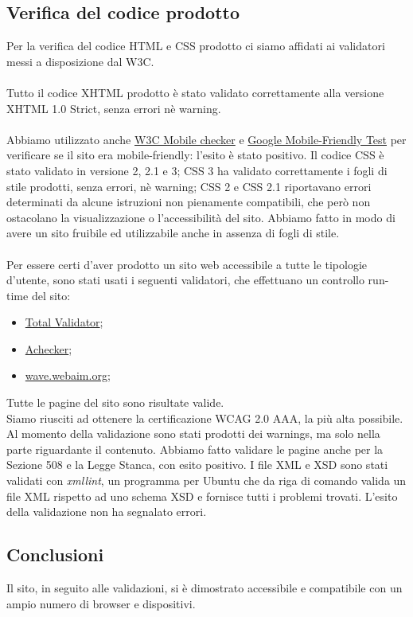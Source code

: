 {	\subsection{Verifica del codice prodotto}{
		Per la verifica del codice HTML e CSS prodotto ci siamo affidati ai validatori messi a disposizione dal W3C.\\
		\\
		Tutto il codice XHTML prodotto è stato validato correttamente alla versione XHTML 1.0 Strict, senza errori nè warning.\\
		\\
		Abbiamo utilizzato anche \href{https://validator.w3.org/mobile-alpha/}{W3C Mobile checker} e \href{https://www.google.com/webmasters/tools/mobile-friendly/}{Google Mobile-Friendly Test} per verificare se il sito era mobile-friendly: l'esito è stato positivo.
		Il codice CSS è stato validato in versione 2, 2.1 e 3; CSS 3 ha validato correttamente i fogli di stile prodotti, senza errori, nè warning; CSS 2 e CSS 2.1 riportavano errori determinati da alcune istruzioni non pienamente compatibili, che però non ostacolano la visualizzazione o l'accessibilità del sito. Abbiamo fatto in modo di avere un sito fruibile ed utilizzabile anche in assenza di fogli di stile.\\
		\\
		Per essere certi d'aver prodotto un sito web accessibile a tutte le tipologie d'utente, sono stati usati i seguenti validatori, che effettuano un controllo run-time del sito:
		\begin{itemize}\itemsep1pt
			\item \href{https://www.totalvalidator.com/}{Total Validator};
			\item \href{http://achecker.ca/checker/index.php}{Achecker};
			\item \href{http://wave.webaim.org/}{wave.webaim.org};
		\end{itemize}
		Tutte le pagine del sito sono risultate valide.\\
		Siamo riusciti ad ottenere la certificazione WCAG 2.0 AAA, la più alta possibile. Al momento della validazione sono stati prodotti dei warnings, ma solo nella parte riguardante il contenuto. Abbiamo fatto validare le pagine anche per la Sezione 508 e la Legge Stanca, con esito positivo.
		I file XML e XSD sono stati validati con \textit{xmllint}, un programma per Ubuntu che da riga di comando valida un file XML rispetto ad uno schema XSD e fornisce tutti i problemi trovati. L'esito della validazione non ha segnalato errori.
	}
	\subsection{Conclusioni}
		Il sito, in seguito alle validazioni, si è dimostrato accessibile e compatibile con un ampio numero di browser e dispositivi.
}
